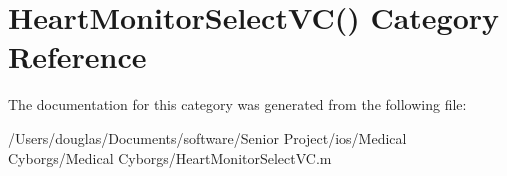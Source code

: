 \hypertarget{category_heart_monitor_select_v_c_07_08}{\section{Heart\-Monitor\-Select\-V\-C() Category Reference}
\label{category_heart_monitor_select_v_c_07_08}
}


The documentation for this category was generated from the following file\-:\begin{DoxyCompactItemize}
\item 
/\-Users/douglas/\-Documents/software/\-Senior Project/ios/\-Medical Cyborgs/\-Medical Cyborgs/Heart\-Monitor\-Select\-V\-C.\-m\end{DoxyCompactItemize}

